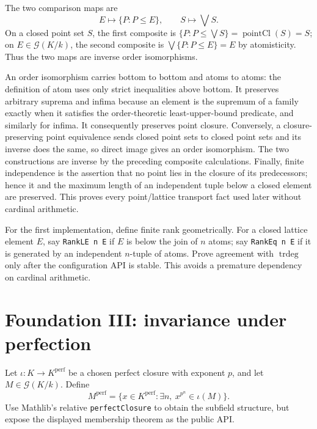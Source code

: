 \documentclass[11pt,oneside]{article}
\theoremstyle{definition}
\theoremstyle{remark}
\newcommand{\G}{\mathcal{G}}
\newcommand{\lean}[1]{\nolinkurl{#1}}
\begin{document}
The two comparison maps are
\[
  E\longmapsto\{P:P\leq E\},\qquad
  S\longmapsto\bigvee S.
\]
On a closed point set $S$, the first composite is
$\{P:P\leq\bigvee S\}=\operatorname{pointCl}(S)=S$; on $E\in\G(K/k)$, the second
composite is $\bigvee\{P:P\leq E\}=E$ by atomisticity.  Thus the two maps are inverse
order isomorphisms.

An order isomorphism carries bottom to bottom and atoms to atoms: the definition of atom
uses only strict inequalities above bottom.  It preserves arbitrary suprema and infima
because an element is the supremum of a family exactly when it satisfies the order-theoretic
least-upper-bound predicate, and similarly for infima.  It consequently preserves point
closure.  Conversely, a closure-preserving point equivalence sends closed point sets to
closed point sets and its inverse does the same, so direct image gives an order isomorphism.
The two constructions are inverse by the preceding composite calculations.  Finally,
finite independence is the assertion that no point lies in the closure of its predecessors;
hence it and the maximum length of an independent tuple below a closed element are
preserved.  This proves every point/lattice transport fact used later without cardinal
arithmetic.

For the first implementation, define finite rank geometrically.  For a closed lattice
element $E$, say \lean{RankLE n E} if $E$ is below the join of $n$ atoms; say
\lean{RankEq n E} if it is generated by an independent $n$-tuple of atoms.  Prove agreement
with $\operatorname{trdeg}$ only after the configuration API is stable.  This avoids a
premature dependency on cardinal arithmetic.

\section{Foundation III: invariance under perfection}

Let $\iota:K\to K^{\mathrm{perf}}$ be a chosen perfect closure with exponent $p$, and
let $M\in\G(K/k)$.  Define
\[
 M^{\mathrm{perf}}
 =\{x\in K^{\mathrm{perf}}:\exists n,\ x^{p^n}\in\iota(M)\}.
\]
Use Mathlib's relative \lean{perfectClosure} to obtain the subfield structure, but expose
the displayed membership theorem as the public API.
\end{document}
